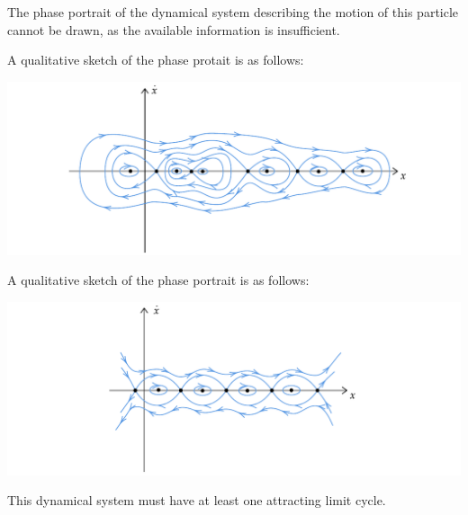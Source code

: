 \documentclass[twoside,10pt,a4paper]{article}
\begin{document}
\begin{enumerate}[label=(\alph*)]
	\item The phase portrait of the dynamical system describing the motion of this particle cannot be drawn, as the available information is insufficient.
	{\color{MyRed}\item A qualitative sketch of the phase protait is as follows:
	
	\includegraphics[scale=0.8]{Graphics/MCQ2_figures/Q09D02.pdf}}
	\item A qualitative sketch of the phase portrait is as follows:
	
	\includegraphics[scale=0.8]{Graphics/MCQ2_figures/Q09D03.pdf}
	\item This dynamical system must have at least one attracting limit cycle.
\end{enumerate}
\end{document}
